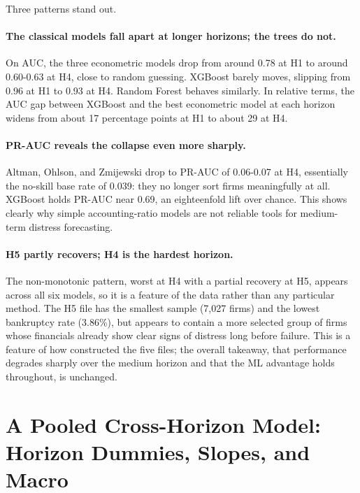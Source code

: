 \documentclass[12pt,a4paper]{article}
\begin{document}
Three patterns stand out.

\paragraph{The classical models fall apart at longer horizons; the trees do
not.} On AUC, the three econometric models drop from around 0.78 at H1 to
around 0.60-0.63 at H4, close to random guessing. XGBoost barely moves,
slipping from 0.96 at H1 to 0.93 at H4. Random Forest behaves similarly. In
relative terms, the AUC gap between XGBoost and the best econometric model at
each horizon widens from about 17 percentage points at H1 to about 29 at H4.

\paragraph{PR-AUC reveals the collapse even more sharply.} Altman, Ohlson,
and Zmijewski drop to PR-AUC of 0.06-0.07 at H4, essentially the no-skill
base rate of 0.039: they no longer sort firms meaningfully at all. XGBoost
holds PR-AUC near 0.69, an eighteenfold lift over chance. This shows clearly
why simple accounting-ratio models are not reliable tools for medium-term
distress forecasting.

\paragraph{H5 partly recovers; H4 is the hardest horizon.} The non-monotonic
pattern, worst at H4 with a partial recovery at H5, appears across all six
models, so it is a feature of the data rather than any particular method.
The H5 file has the smallest sample (7,027 firms) and the lowest bankruptcy
rate (3.86\%), but appears to contain a more selected group of firms whose
financials already show clear signs of distress long before failure.
This is a feature of how \cite{zieba2016} constructed the five files; the
overall takeaway, that performance degrades sharply over the medium horizon
and that the ML advantage holds throughout, is unchanged.

\clearpage
\section{A Pooled Cross-Horizon Model: Horizon Dummies, Slopes, and Macro}\label{sec:pooled}
\end{document}

